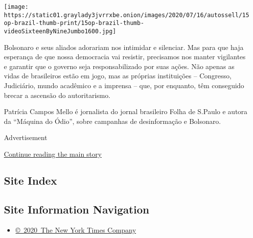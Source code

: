 \texttt{[image: https://static01.graylady3jvrrxbe.onion/images/2020/07/16/autossell/15op-brazil-thumb-print/15op-brazil-thumb-videoSixteenByNineJumbo1600.jpg]}

Bolsonaro e seus aliados adorariam nos intimidar e silenciar. Mas para
que haja esperança de que nossa democracia vai resistir, precisamos nos
manter vigilantes e garantir que o governo seja responsabilizado por
suas ações. Não apenas as vidas de brasileiros estão em jogo, mas as
próprias instituições -- Congresso, Judiciário, mundo acadêmico e a
imprensa -- que, por enquanto, têm conseguido brecar a ascensão do
autoritarismo.

Patrícia Campos Mello é jornalista do jornal brasileiro Folha de S.Paulo
e autora da ``Máquina do Ódio'', sobre campanhas de desinformação e
Bolsonaro.

Advertisement

\protect\hyperlink{after-bottom}{Continue reading the main story}

\hypertarget{site-index}{%
\subsection{Site Index}\label{site-index}}

\hypertarget{site-information-navigation}{%
\subsection{Site Information
Navigation}\label{site-information-navigation}}

\begin{itemize}
\tightlist
\item
  \href{https://help.nytimes3xbfgragh.onion/hc/en-us/articles/115014792127-Copyright-notice}{©~2020~The
  New York Times Company}
\end{itemize}

